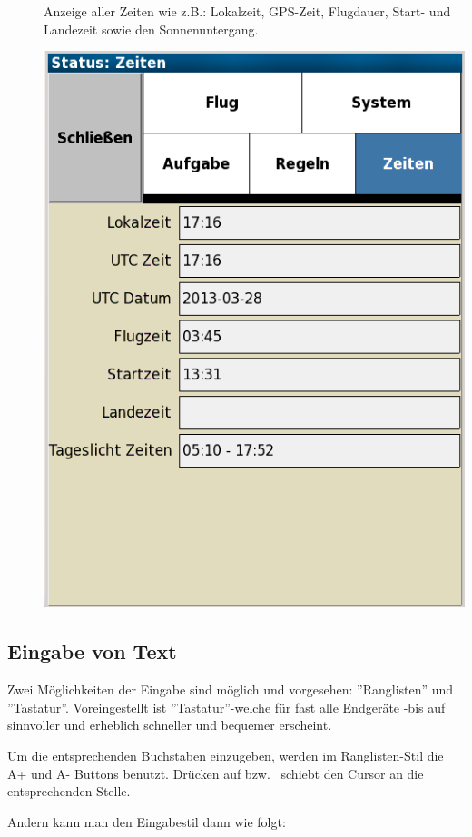 \begin{description}
\item[] Anzeige aller Zeiten wie z.B.: Lokalzeit, GPS-Zeit, Flugdauer, Start-  und Landezeit sowie den Sonnenuntergang.
\begin{center}
\includegraphics[angle=0,width=0.5\linewidth,keepaspectratio='true']{figures/status-times.png}
\end{center}
\end{description}

\subsection*{Eingabe von Text} \label{sec:textentry}



Zwei Möglichkeiten der Eingabe sind möglich und vorgesehen:  ''Ranglisten''  und ''Tastatur''.
 Voreingestellt ist ''Tastatur''-welche für fast alle Endgeräte -bis auf \al sinnvoller und erheblich schneller und bequemer erscheint.

Um die entsprechenden  Buchstaben einzugeben, werden im Ranglisten-Stil die A+ und  A-  Buttons benutzt.
Drücken auf  \button{$<$} bzw.\   \button{$>$} schiebt den Cursor an die entsprechenden Stelle.

Andern kann man den Eingabestil dann wie folgt: 




